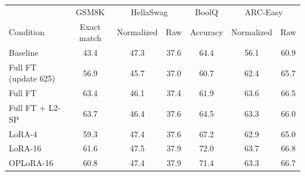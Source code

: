 \begin{tabular}{lcccccc}\toprule & GSM8K & \multicolumn{2}{c}{HellaSwag} & BoolQ & \multicolumn{2}{c}{ARC-Easy} \\ Condition & Exact match & Normalized & Raw & Accuracy & Normalized & Raw \\ \midrule
Baseline & 43.4 & 47.3 & 37.6 & 64.4 & 56.1 & 60.9 \\
Full FT (update 625) & 56.9 & 45.7 & 37.0 & 60.7 & 62.4 & 65.7 \\
Full FT & 63.4 & 46.1 & 37.4 & 61.9 & 63.6 & 66.5 \\
Full FT + L2-SP & 63.7 & 46.4 & 37.6 & 64.5 & 63.3 & 66.0 \\
LoRA-4 & 59.3 & 47.4 & 37.6 & 67.2 & 62.9 & 65.0 \\
LoRA-16 & 61.6 & 47.5 & 37.9 & 72.0 & 63.7 & 66.8 \\
OPLoRA-16 & 60.8 & 47.4 & 37.9 & 71.4 & 63.3 & 66.7 \\
\bottomrule\end{tabular}
